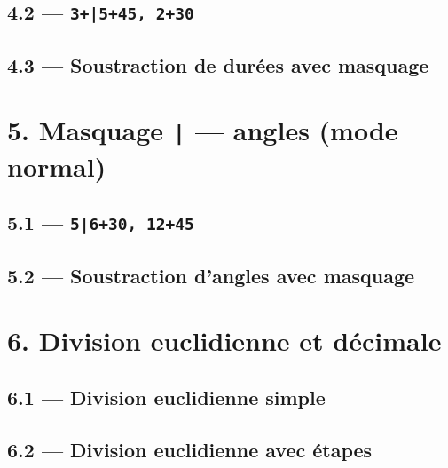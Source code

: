\documentclass[12pt]{extarticle}
\begin{document}

\subsection*{4.2 — \texttt{3+|5+45, 2+30}}


\subsection*{4.3 — Soustraction de durées avec masquage}


\section*{5. Masquage \texttt{|} — angles (mode normal)}

\subsection*{5.1 — \texttt{5|6+30, 12+45}}


\subsection*{5.2 — Soustraction d'angles avec masquage}


\section*{6. Division euclidienne et décimale}

\subsection*{6.1 — Division euclidienne simple}

\division[dividende=1234, diviseur=56, solution]

\subsection*{6.2 — Division euclidienne avec étapes}
\end{document}
